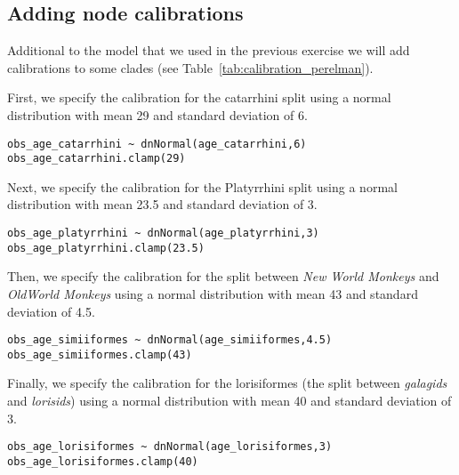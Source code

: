 
\subsection{Adding node calibrations}
Additional to the model that we used in the previous exercise we will add calibrations to some clades (see Table~\ref{tab:calibration_perelman}).

First, we specify the calibration for the catarrhini split using a normal distribution with mean 29 and standard deviation of 6.
{\tt \begin{snugshade*}
\begin{lstlisting}
obs_age_catarrhini ~ dnNormal(age_catarrhini,6)
obs_age_catarrhini.clamp(29)
\end{lstlisting}
\end{snugshade*}}

Next, we specify the calibration for the Platyrrhini split using a normal distribution with mean 23.5 and standard deviation of 3.
{\tt \begin{snugshade*}
\begin{lstlisting}
obs_age_platyrrhini ~ dnNormal(age_platyrrhini,3)
obs_age_platyrrhini.clamp(23.5)
\end{lstlisting}
\end{snugshade*}}

Then, we specify the calibration for the split between \emph{New World Monkeys} and \emph{OldWorld Monkeys}  using a normal distribution with mean 43 and standard deviation of 4.5.
{\tt \begin{snugshade*}
\begin{lstlisting}
obs_age_simiiformes ~ dnNormal(age_simiiformes,4.5)
obs_age_simiiformes.clamp(43)
\end{lstlisting}
\end{snugshade*}}

Finally, we specify the calibration for the lorisiformes (the split between \emph{galagids} and \emph{lorisids}) using a normal distribution with mean 40 and standard deviation of 3.
{\tt \begin{snugshade*}
\begin{lstlisting}
obs_age_lorisiformes ~ dnNormal(age_lorisiformes,3)
obs_age_lorisiformes.clamp(40)
\end{lstlisting}
\end{snugshade*}}



